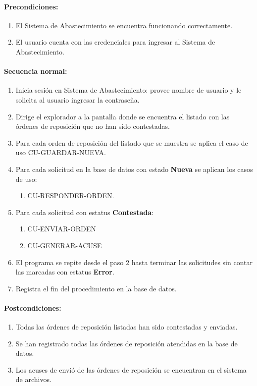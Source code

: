 \paragraph{Precondiciones:}
\begin{enumerate}
  \item El Sistema de Abastecimiento se encuentra funcionando correctamente.
  \item El usuario cuenta con las credenciales para ingresar al Sistema de Abastecimiento.
\end{enumerate}
\paragraph{Secuencia normal:}
\begin{enumerate}
  \item Inicia sesión en Sistema de Abastecimiento: provee nombre de usuario y le solicita al usuario ingresar la contraseña.
  \item Dirige el explorador a la pantalla donde se encuentra el listado con las órdenes de reposición que no han sido contestadas.
  \item Para cada orden de reposición del listado que se muestra se aplica el caso de uso CU-GUARDAR-NUEVA.
  \item Para cada solicitud en la base de datos con estado \textbf{Nueva} se aplican los casos de uso:
  \begin{enumerate}
    \item CU-RESPONDER-ORDEN.
  \end{enumerate}
  \item Para cada solicitud con estatus \textbf{Contestada}:
  \begin{enumerate}
    \item CU-ENVIAR-ORDEN
    \item CU-GENERAR-ACUSE
  \end{enumerate}
  \item El programa se repite desde el paso 2 hasta terminar las solicitudes sin contar las marcadas con estatus \textbf{Error}.
  \item Registra el fin del procedimiento en la base de datos.
\end{enumerate}
\paragraph{Postcondiciones:}
\begin{enumerate}
  \item Todas las órdenes de reposición listadas han sido contestadas y enviadas.
  \item Se han registrado todas las órdenes de reposición atendidas en la base de datos.
  \item Los acuses de envió de las órdenes de reposición se encuentran en el sistema de archivos.
\end{enumerate}
